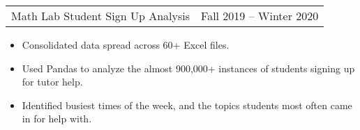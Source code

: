 \documentclass[12pt]{article}
\newenvironment{compactItemize}{
  \begin{itemize}[itemsep=0ex, parsep=0ex, partopsep=0ex, topsep= -7pt]
}{
  \end{itemize}
}
\newcommand{\project}[2]{
  \begingroup
  \setlength{\tabcolsep}{0ex}
  \begin{tabularx}{\linewidth}{X r}
    #1 & %
    #2\\ %
  \end{tabularx}%
  \endgroup%
}
\begin{document}
\project{Math Lab Student Sign Up Analysis}{Fall 2019 -- Winter 2020}
\begin{compactItemize}
  \item Consolidated data spread across 60+ Excel files.
  \item Used Pandas to analyze the almost 900,000+ instances of students signing up for tutor help.
  \item Identified busiest times of the week, and the topics students most often came in for help with.
\end{compactItemize}
\medskip
\begin{comment}
\project{HTTP Proxy}{Winter 2020}
\begin{compactItemize}
  \item C program that relayed user requests to end server, and relayed server responses to user.
  \item Used \texttt{regex.h} to verify that user requests met HTTP formatting requirements.
  \item Handled concurrent requests with a threadpool using \texttt{pthread.h} and \texttt{semaphore.h}.
\end{compactItemize}
\medskip

\project{DNS Stub Resolver}{Winter 2020}
\begin{compactItemize}
  \item Program interfaced with DNS servers to look up IP addresses associated with a web domain name.
        For example, it would figure out that the domain name www.example.com is associated with IP address 93.184.216.34.
  \item Formatted queries to DNS standards, sent the queries with UDP, and then decoded responses.
  \item Written C with \texttt{unistd.h}, \texttt{sys/socket.h}, \texttt{arpa/inet.h}, and \texttt{netinet/in.h}.
\end{compactItemize}
\medskip

\project{OpenMP with Mandelbrot Set}{Winter 2020}
\begin{compactItemize}
  \item Parallelized the \href{https://gist.github.com/andrejbauer/7919569}{Mandelbrot visualization code} posted on github by Andrej Bauer.
\end{compactItemize}
\medskip

\project{Tiny Shell}{Winter 2020}
\begin{compactItemize}
  \item Wrote a simple shell that could handle process creation, I/O redirection and pipelines, and process control.
  \item Used C with \texttt{unistd.h} and \texttt{signal.h}.
\end{compactItemize}
\medskip


\end{comment}
\end{document}
